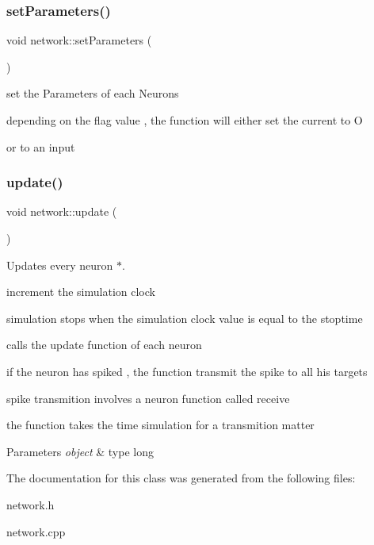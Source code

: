 \subsubsection{\texorpdfstring{set\+Parameters()}{setParameters()}}
{\footnotesize\ttfamily void network\+::set\+Parameters (\begin{DoxyParamCaption}{ }\end{DoxyParamCaption})}



set the Parameters of each Neurons 

depending on the flag value , the function will either set the current to O

or to an input \mbox{\label{classnetwork_ae522c71a541b541797dcf0aa3a4787dd}} 
\subsubsection{\texorpdfstring{update()}{update()}}
{\footnotesize\ttfamily void network\+::update (\begin{DoxyParamCaption}{ }\end{DoxyParamCaption})}



Updates every neuron $\ast$. 

increment the simulation clock

simulation stops when the simulation clock value is equal to the stoptime

calls the update function of each neuron

if the neuron has spiked , the function transmit the spike to all his targets

spike transmition involves a neuron function called receive

the function takes the time simulation for a transmition matter


\begin{DoxyParams}{Parameters}
{\em object} & type long \\
\hline
\end{DoxyParams}


The documentation for this class was generated from the following files\+:\begin{DoxyCompactItemize}
\item 
network.\+h\item 
network.\+cpp\end{DoxyCompactItemize}
